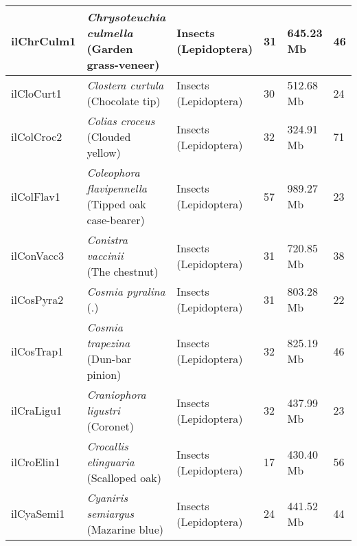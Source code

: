 \begin{centering}
\begin{longtable}{l|l|l|l|l|l}
ilChrCulm1 & \makecell[{l}]{\textit{Chrysoteuchia culmella} \\ (Garden grass-veneer)} & \makecell[{l}]{Insects \\ (Lepidoptera)} & 31 & 645.23 Mb & 46  \\ \hline
ilCloCurt1 & \makecell[{l}]{\textit{Clostera curtula} \\ (Chocolate tip)} & \makecell[{l}]{Insects \\ (Lepidoptera)} & 30 & 512.68 Mb & 24  \\ \hline
ilColCroc2 & \makecell[{l}]{\textit{Colias croceus} \\ (Clouded yellow)} & \makecell[{l}]{Insects \\ (Lepidoptera)} & 32 & 324.91 Mb & 71  \\ \hline
ilColFlav1 & \makecell[{l}]{\textit{Coleophora flavipennella} \\ (Tipped oak case-bearer)} & \makecell[{l}]{Insects \\ (Lepidoptera)} & 57 & 989.27 Mb & 23  \\ \hline
ilConVacc3 & \makecell[{l}]{\textit{Conistra vaccinii} \\ (The chestnut)} & \makecell[{l}]{Insects \\ (Lepidoptera)} & 31 & 720.85 Mb & 38  \\ \hline
ilCosPyra2 & \makecell[{l}]{\textit{Cosmia pyralina} \\ (.)} & \makecell[{l}]{Insects \\ (Lepidoptera)} & 31 & 803.28 Mb & 22  \\ \hline
ilCosTrap1 & \makecell[{l}]{\textit{Cosmia trapezina} \\ (Dun-bar pinion)} & \makecell[{l}]{Insects \\ (Lepidoptera)} & 32 & 825.19 Mb & 46  \\ \hline
ilCraLigu1 & \makecell[{l}]{\textit{Craniophora ligustri} \\ (Coronet)} & \makecell[{l}]{Insects \\ (Lepidoptera)} & 32 & 437.99 Mb & 23  \\ \hline
ilCroElin1 & \makecell[{l}]{\textit{Crocallis elinguaria} \\ (Scalloped oak)} & \makecell[{l}]{Insects \\ (Lepidoptera)} & 17 & 430.40 Mb & 56  \\ \hline
ilCyaSemi1 & \makecell[{l}]{\textit{Cyaniris semiargus} \\ (Mazarine blue)} & \makecell[{l}]{Insects \\ (Lepidoptera)} & 24 & 441.52 Mb & 44  \\ \hline

\end{longtable}
\end{centering}
